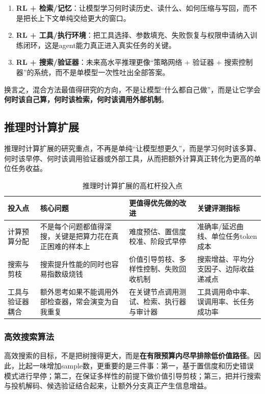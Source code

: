 \documentclass[12pt,a4paper]{article}
\begin{document}
\begin{enumerate}
    \item \textbf{RL + 检索/记忆}：让模型学习何时读历史、读什么、如何压缩与写回，而不是把长上下文单纯交给更大的窗口。
    \item \textbf{RL + 工具/执行环境}：把工具选择、参数填充、失败恢复与权限申请纳入训练闭环，这是agent能力真正进入真实任务的关键。
    \item \textbf{RL + 搜索/验证器}：未来高水平推理更像“策略网络 + 验证器 + 搜索控制器”的系统，而不是单模型一次性吐出全部答案。
\end{enumerate}

换言之，混合方法最值得研究的方向，不是让模型“什么都自己做”，而是让它学会\textbf{何时该自己算，何时该检索，何时该调用外部机制}。

\subsection{推理时计算扩展}

推理时计算扩展的研究重点，不再是单纯“让模型想更久”，而是学习何时该多算、何时该早停、何时该调用验证器或外部工具，从而把额外计算真正转化为更高的单位任务收益。

\begin{table}[H]
\centering
\small
\caption{推理时计算扩展的高杠杆投入点}
\begin{tabular}{p{3.0cm}p{4.0cm}p{3.7cm}p{3.2cm}}
\toprule
\textbf{投入点} & \textbf{核心问题} & \textbf{更值得优先做的改进} & \textbf{关键评测指标} \\
\midrule
计算预算分配 & 不是每个问题都值得深搜，关键是把算力花在真正困难的样本上 & 难度预估、置信度校准、阶段式早停 & 准确率/延迟曲线、单位任务token成本 \\
搜索与剪枝 & 搜索提升性能的同时也容易指数级烧钱 & 价值引导剪枝、多样性控制、失败回收机制 & 搜索增益、平均分支因子、边际收益递减点 \\
工具与验证器耦合 & 额外思考如果不能调用外部检查器，常会演变为自我重复 & 在关键节点调用测试、检索、执行器与审计器 & 工具调用命中率、误调用率、长任务成功率 \\
\bottomrule
\end{tabular}
\end{table}

\subsubsection{高效搜索算法}

高效搜索的目标，不是把树搜得更大，而是\textbf{在有限预算内尽早排除低价值路径}。因此，比起一味增加sample数，更重要的是三件事：第一，基于置信度和历史错误模式进行早停；第二，在保证多样性的前提下做价值引导剪枝；第三，把并行搜索与投机解码、候选验证结合起来，让额外分支真正产生信息增益。
\end{document}
